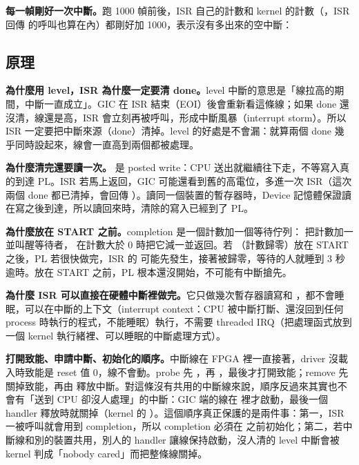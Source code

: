 \textbf{每一幀剛好一次中斷。}跑 1000 幀前後，ISR 自己的計數和 kernel 的計數（，ISR 回傳  的呼叫也算在內）都剛好加 1000，表示沒有多出來的空中斷：


\subsection{原理}

\textbf{為什麼用 level，ISR 為什麼一定要清 done。}level 中斷的意思是「線拉高的期間，中斷一直成立」。GIC 在 ISR 結束（EOI）後會重新看這條線；如果 done 還沒清，線還是高，ISR 會立刻再被呼叫，形成中斷風暴（interrupt storm）。所以 ISR 一定要把中斷來源（done）清掉。level 的好處是不會漏：就算兩個 done 幾乎同時設起來，線會一直高到兩個都被處理。

\textbf{為什麼清完還要讀一次。} 是 posted write：CPU 送出就繼續往下走，不等寫入真的到達 PL。ISR 若馬上返回，GIC 可能還看到舊的高電位，多進一次 ISR（這次兩個 done 都已清掉，會回傳 ）。讀同一個裝置的暫存器時，Device 記憶體保證讀在寫之後到達，所以讀回來時，清除的寫入已經到了 PL。

\textbf{ 為什麼放在 START 之前。}completion 是一個計數加一個等待佇列： 把計數加一並叫醒等待者， 在計數大於 0 時把它減一並返回。若 （計數歸零）放在 START 之後，PL 若很快做完，ISR 的  可能先發生，接著被歸零，等待的人就睡到 3 秒逾時。放在 START 之前，PL 根本還沒開始，不可能有中斷搶先。

\textbf{為什麼 ISR 可以直接在硬體中斷裡做完。}它只做幾次暫存器讀寫和 ，都不會睡眠，可以在中斷的上下文（interrupt context：CPU 被中斷打斷、還沒回到任何 process 時執行的程式，不能睡眠）執行，不需要 threaded IRQ（把處理函式放到一個 kernel 執行緒裡、可以睡眠的中斷處理方式）。

\textbf{打開致能、申請中斷、初始化的順序。}中斷線在 FPGA 裡一直接著，driver 沒載入時致能是 reset 值 0，線不會動。probe 先 ，再 ，最後才打開致能；remove 先關掉致能，再由  釋放中斷。對這條沒有共用的中斷線來說，順序反過來其實也不會有「送到 CPU 卻沒人處理」的中斷：GIC 端的線在  裡才啟動，最後一個 handler 釋放時就關掉（kernel 的 ）。這個順序真正保護的是兩件事：第一，ISR 一被呼叫就會用到 completion，所以 completion 必須在  之前初始化；第二，若中斷線和別的裝置共用，別人的 handler 讓線保持啟動，沒人清的 level 中斷會被 kernel 判成「nobody cared」而把整條線關掉。

